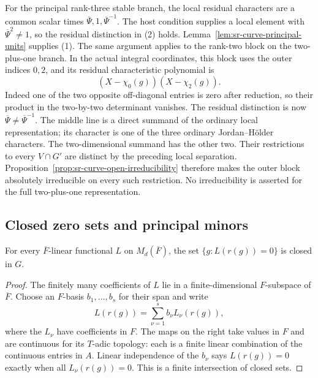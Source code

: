 For the principal rank-three stable branch, the local residual
characters are a common scalar times
\(\overline\Psi,1,\overline\Psi^{-1}\).
The host condition supplies a local element with
\(\overline\Psi^2\ne1\), so the residual distinction in (2)
holds.  Lemma~\ref{lem:sr-curve-principal-units} supplies (1).
The same argument applies to the rank-two block on the
two-plus-one branch.  In the actual integral coordinates,
this block uses the outer indices \(0,2\), and its residual
characteristic polynomial is
\[
        (X-\chi_0(g))(X-\chi_2(g)).
\]
Indeed one of the two opposite off-diagonal entries is zero
after reduction, so their product in the two-by-two
determinant vanishes.  The residual distinction is now
\(\overline\Psi\ne\overline\Psi^{-1}\).
The middle line is a direct summand of the ordinary local
representation; its character is one of the three ordinary
Jordan--Hölder characters.  The two-dimensional summand has
the other two.  Their restrictions to every \(V\cap G'\)
are distinct by the preceding local separation.
Proposition~\ref{prop:sr-curve-open-irreducibility} therefore
makes the outer block absolutely irreducible on every such
restriction.  No irreducibility is asserted for the full
two-plus-one representation.

\subsection{Closed zero sets and principal minors}
\begin{srlemma}
\label{lem:sr-curve-linear-closedness}
For every \(\overline F\)-linear functional \(L\) on
\(M_d(\overline F)\), the set
\(\{g:L(r(g))=0\}\) is closed in \(G\).
\end{srlemma}
\begin{proof}
The finitely many coefficients of \(L\) lie in a
finite-dimensional \(F\)-subspace of \(\overline F\).
Choose an \(F\)-basis \(b_1,\ldots,b_s\) for their span and
write
\[
                  L(r(g))=\sum_{\nu=1}^s b_\nu L_\nu(r(g)),
\]
where the \(L_\nu\) have coefficients in \(F\).
The maps on the right take values in \(F\) and are continuous
for its \(T\)-adic topology: each is a finite linear
combination of the continuous entries in \(A\).
Linear independence of the \(b_\nu\) says \(L(r(g))=0\)
exactly when all \(L_\nu(r(g))=0\).
This is a finite intersection of closed sets.
\end{proof}

